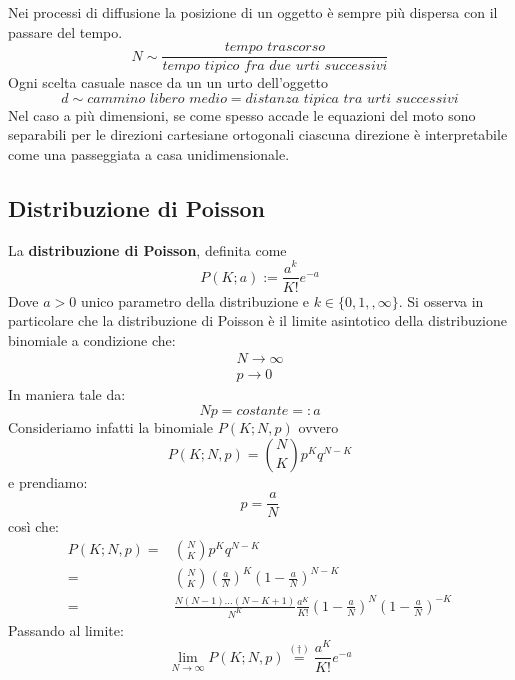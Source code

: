 \documentclass[11pt,a4paper]{book}
\begin{document}
Nei processi di diffusione la posizione di un oggetto è sempre più dispersa con il passare del tempo. 
\begin{equation}
N\sim \dfrac{\textit{tempo trascorso}}{\textit{tempo tipico fra due urti successivi}}
\end{equation}
Ogni scelta casuale nasce da un un urto dell'oggetto
\begin{equation}
d \sim \textit{cammino libero medio} = \textit{distanza tipica tra urti successivi}
\end{equation}
Nel caso a più dimensioni, se come spesso accade le equazioni del moto sono separabili per le direzioni cartesiane ortogonali ciascuna direzione è interpretabile come una passeggiata a casa unidimensionale.
\subsection{Distribuzione di Poisson} 
La \textbf{distribuzione di Poisson}, definita come
\begin{equation}
P(K;a):= \frac{a^k}{K!}e^{-a}
\end{equation}
Dove $ a > 0 $ unico parametro della distribuzione e $ k \in \{0,1,,\infty\} $. Si osserva in particolare che la distribuzione di Poisson è il limite asintotico della distribuzione binomiale a condizione che:
\begin{eqnarray}
N\to \infty\\
p \to 0
\end{eqnarray} 
In maniera tale da:
\begin{equation}
Np = \textit{costante} =: a
\end{equation}
Consideriamo infatti la binomiale $ P(K;N,p) $ ovvero
\begin{equation}
P(K;N,p) = \binom{N}{K}p^Kq^{N-K}
\end{equation}
e prendiamo:
\begin{equation}
p = \frac{a}{N}
\end{equation}
così che:
\begin{align}
P(K;N,p) =& \binom{N}{K}p^Kq^{N-K} \\
=& \binom{N}{K}\left(\frac{a}{N} \right)^K \left(1- \frac{a}{N} \right)^{N-K} \\
=& \frac{N(N-1)\dots (N-K+1)}{N^K}\frac{a^K}{K!}\left(1- \frac{a}{N} \right)^N \left(1- \frac{a}{N} \right)^{-K} \label{eq_binomiale to poisson}
\end{align}
Passando al limite:
\begin{equation}
\lim\limits_{N \to \infty} P(K;N,p) \stackrel{(\dag)}{=} \frac{a^K}{K!} e^{-a}
\end{equation}
\end{document}
